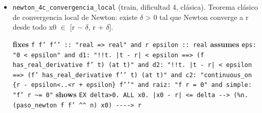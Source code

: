 \documentclass[11pt,a4paper]{article}
\begin{document}
\begin{itemize}
  {\footnotesize \textbf{fixes} \texttt{f f' f'{}' :\allowbreak{}:\allowbreak{} "real =\allowbreak{}> real" and r delta m M :\allowbreak{}:\allowbreak{} real and x0 :\allowbreak{}:\allowbreak{} real} \textbf{assumes} \texttt{d1:\allowbreak{} "!{}!t. |\allowbreak{}t -\allowbreak{} r|\allowbreak{} <=\allowbreak{} delta =\allowbreak{}=\allowbreak{}> (\allowbreak{}f has\_\allowbreak{}real\_\allowbreak{}derivative f' t) (\allowbreak{}at t)" and d2:\allowbreak{} "!{}!t. |\allowbreak{}t -\allowbreak{} r|\allowbreak{} <=\allowbreak{} delta =\allowbreak{}=\allowbreak{}> (\allowbreak{}f' has\_\allowbreak{}real\_\allowbreak{}derivative f'{}' t) (\allowbreak{}at t)" and raiz:\allowbreak{} "f r =\allowbreak{} 0" and m\_\allowbreak{}pos:\allowbreak{} "0 < m" and cota1:\allowbreak{} "!{}!t. |\allowbreak{}t -\allowbreak{} r|\allowbreak{} <=\allowbreak{} delta =\allowbreak{}=\allowbreak{}> m <=\allowbreak{} |\allowbreak{}f' t|\allowbreak{}" and cota2:\allowbreak{} "!{}!t. |\allowbreak{}t -\allowbreak{} r|\allowbreak{} <=\allowbreak{} delta =\allowbreak{}=\allowbreak{}> |\allowbreak{}f'{}' t|\allowbreak{} <=\allowbreak{} M" and delta\_\allowbreak{}pos:\allowbreak{} "0 < delta" and delta\_\allowbreak{}chico:\allowbreak{} "M *\allowbreak{} delta <=\allowbreak{} m" and hx0:\allowbreak{} "|\allowbreak{}x0 -\allowbreak{} r|\allowbreak{} <=\allowbreak{} delta"} \textbf{shows} \texttt{(\allowbreak{}\%n. (\allowbreak{}paso\_\allowbreak{}newton f f' \textasciicircum{}\textasciicircum{} n) x0) -\allowbreak{}{}-\allowbreak{}{}-\allowbreak{}{}-\allowbreak{}{}> r}\par}
  \item \texttt{newton\_\allowbreak{}4c\_\allowbreak{}convergencia\_\allowbreak{}local} (train, dificultad 4, clásica). Teorema clásico de convergencia local de Newton: existe $\delta $ > 0 tal que Newton converge a r desde todo x0 $\in $ [r $-$ $\delta $, r + $\delta $].\\
  {\footnotesize \textbf{fixes} \texttt{f f' f'{}' :\allowbreak{}:\allowbreak{} "real =\allowbreak{}> real" and r epsilon :\allowbreak{}:\allowbreak{} real} \textbf{assumes} \texttt{eps:\allowbreak{} "0 < epsilon" and d1:\allowbreak{} "!{}!t. |\allowbreak{}t -\allowbreak{} r|\allowbreak{} < epsilon =\allowbreak{}=\allowbreak{}> (\allowbreak{}f has\_\allowbreak{}real\_\allowbreak{}derivative f' t) (\allowbreak{}at t)" and d2:\allowbreak{} "!{}!t. |\allowbreak{}t -\allowbreak{} r|\allowbreak{} < epsilon =\allowbreak{}=\allowbreak{}> (\allowbreak{}f' has\_\allowbreak{}real\_\allowbreak{}derivative f'{}' t) (\allowbreak{}at t)" and c2:\allowbreak{} "continuous\_\allowbreak{}on \{r -\allowbreak{} epsilon<..<r +\allowbreak{} epsilon\} f'{}'" and raiz:\allowbreak{} "f r =\allowbreak{} 0" and simple:\allowbreak{} "f' r \textasciitilde{}=\allowbreak{} 0"} \textbf{shows} \texttt{EX delta>0. ALL x0. |\allowbreak{}x0 -\allowbreak{} r|\allowbreak{} <=\allowbreak{} delta -\allowbreak{}{}-\allowbreak{}{}> (\allowbreak{}\%n. (\allowbreak{}paso\_\allowbreak{}newton f f' \textasciicircum{}\textasciicircum{} n) x0) -\allowbreak{}{}-\allowbreak{}{}-\allowbreak{}{}-\allowbreak{}{}> r}\par}

\end{itemize}
\end{document}
